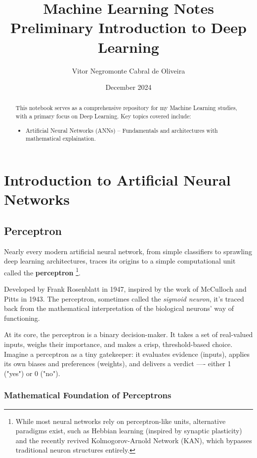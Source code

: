 \documentclass{article}
\title{Machine Learning Notes \\ Preliminary Introduction to Deep Learning}
\author{Vitor Negromonte Cabral de Oliveira}
\date{December 2024}
\begin{document}
\maketitle
\begin{abstract}
    This notebook serves as a comprehensive repository for my Machine Learning studies, with a primary focus on Deep Learning. Key topics covered include:
    \begin{itemize}
        \item Artificial Neural Networks (ANNs) – Fundamentals and architectures with mathematical explaination.
    \end{itemize}
\end{abstract}

\newpage
\tableofcontents
\newpage
\section{Introduction to Artificial Neural Networks}

\subsection{Perceptron}

Nearly every modern artificial neural network, from simple classifiers to sprawling deep learning architectures, traces its origins to a simple computational unit called the \textbf{perceptron} \footnote[1]{While most neural networks rely on perceptron-like units, alternative paradigms exist, such as Hebbian learning (inspired by synaptic plasticity) and the recently revived Kolmogorov-Arnold Network (KAN), which bypasses traditional neuron structures entirely.}.

Developed by Frank Rosenblatt in 1947, inspired by the work of McCulloch and Pitts in 1943. The perceptron, sometimes called the \textit{sigmoid neuron}, it's traced back from the mathematical interpretation of the biological neurons' way of functioning.

At its core, the perceptron is a binary decision-maker. It takes a set of real-valued inputs, weighs their importance, and makes a crisp, threshold-based choice. Imagine a perceptron as a tiny gatekeeper: it evaluates evidence (inputs), applies its own biases and preferences (weights), and delivers a verdict —- either 1 ("yes") or 0 ("no").

\subsubsection{Mathematical Foundation of Perceptrons}
\end{document}
